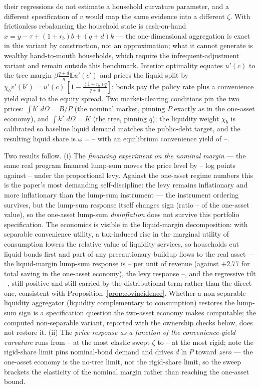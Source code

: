 \documentclass[12pt]{article}
\providecommand{\pendingnum}{\textit{--}}
\providecommand{\TwoAOmega}{\pendingnum}\providecommand{\TwoASpread}{\pendingnum}
\providecommand{\TwoADlnPLS}{\pendingnum}\providecommand{\TwoADlnPLevy}{\pendingnum}
\providecommand{\TwoARatioLS}{\pendingnum}
\providecommand{\TwoAZetaLoP}{\pendingnum}\providecommand{\TwoAZetaHiP}{\pendingnum}
\providecommand{\TwoAEpsLs}{\pendingnum}\providecommand{\TwoAEpsLevy}{\pendingnum}
\providecommand{\TwoAEpsTilt}{\pendingnum}
\newcommand{\E}{\mathbb{E}}
\newcommand{\dd}{\,d}
\begin{document}
their regressions do not estimate a household curvature parameter, and a
different specification of $v$ would map the same evidence into a different
$\zeta$. With frictionless rebalancing the household
state is cash-on-hand $x = y - \tau + (1+r_b)b + (q+d)k$ --- the
one-dimensional aggregation is exact in this variant by construction, not an
approximation; what it cannot generate is wealthy hand-to-mouth households,
which require the infrequent-adjustment variant and remain outside this
benchmark. Interior optimality equates $u'(c)$ to the tree margin
$\beta \frac{q+d}{q}\E u'(c')$ and prices the liquid split by
$\chi_b v'(b') = u'(c)\,[1-\frac{(1+r_b)q}{q+d}]$: bonds pay the policy rate
plus a convenience yield equal to the equity spread. Two market-clearing
conditions pin the two prices: $\int b'\,\dd\Omega = B/P$ (the nominal
market, pinning $P$ exactly as in the one-asset economy), and
$\int k'\,\dd\Omega = \bar K$ (the tree, pinning $q$); the liquidity weight
$\chi_b$ is calibrated so baseline liquid demand matches the public-debt
target, and the resulting liquid share is $\omega = \TwoAOmega$ with an
equilibrium convenience yield of $\TwoASpread$.

Two results follow.
(i) The \emph{financing experiment on the nominal margin} --- the same
real program financed lump-sum moves the price level by $\TwoADlnPLS$ log
points against $\TwoADlnPLevy$ under the proportional levy. Against the
one-asset regime numbers this is the paper's most demanding
self-discipline: the
levy remains inflationary and more inflationary than the lump-sum
instrument --- the instrument ordering survives, but the
lump-sum response itself changes sign (ratio $\TwoARatioLS$ of the
one-asset value), so the one-asset lump-sum \emph{disinflation} does not
survive this portfolio specification. The economics is visible in the
liquid-margin decomposition:
with separable convenience utility, a tax-induced rise in the marginal
utility of consumption lowers the relative value of liquidity services, so
households cut liquid bonds first and part of any precautionary buildup
flows to the real asset --- the liquid-margin lump-sum response is
$\TwoAEpsLs$ per unit of revenue (against $+2.77$ for total saving in the
one-asset economy), the levy response $\TwoAEpsLevy$, and the regressive
tilt $\TwoAEpsTilt$, still positive and still carried by the
distributional term rather than the direct one, consistent with
Proposition~\ref{prop:covincidence}. Whether a non-separable liquidity
aggregator (liquidity complementary to consumption) restores the lump-sum
sign is a specification question the two-asset economy makes computable;
the computed non-separable variant, reported with the ownership checks
below, does not restore it. (ii) The \emph{price
response as a function of the convenience-yield curvature} runs from
$\TwoAZetaLoP$ at the most elastic swept $\zeta$ to $\TwoAZetaHiP$ at the
most rigid; note the rigid-share limit pins nominal-bond demand and drives
$d\ln P$ toward \emph{zero} --- the one-asset economy is the no-tree
limit, not the rigid-share limit, so the sweep brackets the elasticity of
the nominal margin rather than reaching the one-asset bound.
\end{document}

